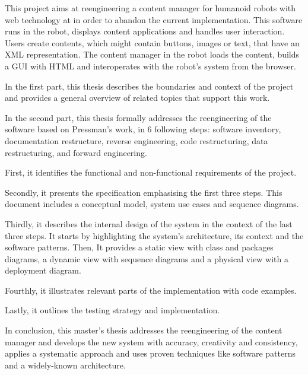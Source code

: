 % 
% 
%

This project aims at reengineering a content manager for humanoid robots with web technology at \company in order to abandon the current \flash implementation.
This software runs in the robot, displays content applications and handles user interaction.
Users create contents, which might contain buttons, images or text, that have an \acs{XML} representation.
The content manager in the robot loads the content, builds a \acs{GUI} with \acs{HTML} and interoperates with the robot's system from the browser.

In the first part, this thesis describes the boundaries and context of the project and provides a general overview of related topics that support this work.

In the second part, this thesis formally addresses the reengineering of the software based on Pressman's work, in 6 following steps: software inventory, documentation restructure, reverse engineering, code restructuring, data restructuring, and forward engineering.

First, it identifies the functional and non-functional requirements of the project.

Secondly, it presents the specification emphasising the first three steps.
This document includes a conceptual model, system use cases and sequence diagrams.

Thirdly, it describes the internal design of the system in the context of the last three steps.
It starts by highlighting the system's architecture, its context and the software patterns.
Then, It provides a static view with class and packages diagrams, a dynamic view with sequence diagrams and a physical view with a deployment diagram.

Fourthly, it illustrates relevant parts of the implementation with code examples.

Lastly, it outlines the testing strategy and implementation.

In conclusion, this master's thesis addresses the reengineering of the content manager and develops the new system with accuracy, creativity and consistency, applies a systematic approach and uses proven techniques like software patterns and a widely-known architecture.


